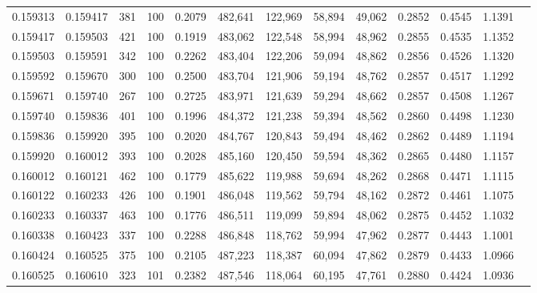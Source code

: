 \begin{tabular}{rrrrrrrrrrrrr}
0.159313 & 0.159417 &   381 & 100 &                                     0.2079 & 482,641 & 122,969 &  58,894 &  49,062 & 0.2852 & 0.4545 & 1.1391 \\
0.159417 & 0.159503 &   421 & 100 &                                     0.1919 & 483,062 & 122,548 &  58,994 &  48,962 & 0.2855 & 0.4535 & 1.1352 \\
0.159503 & 0.159591 &   342 & 100 &                                     0.2262 & 483,404 & 122,206 &  59,094 &  48,862 & 0.2856 & 0.4526 & 1.1320 \\
0.159592 & 0.159670 &   300 & 100 &                                     0.2500 & 483,704 & 121,906 &  59,194 &  48,762 & 0.2857 & 0.4517 & 1.1292 \\
0.159671 & 0.159740 &   267 & 100 &                                     0.2725 & 483,971 & 121,639 &  59,294 &  48,662 & 0.2857 & 0.4508 & 1.1267 \\
0.159740 & 0.159836 &   401 & 100 &                                     0.1996 & 484,372 & 121,238 &  59,394 &  48,562 & 0.2860 & 0.4498 & 1.1230 \\
0.159836 & 0.159920 &   395 & 100 &                                     0.2020 & 484,767 & 120,843 &  59,494 &  48,462 & 0.2862 & 0.4489 & 1.1194 \\
0.159920 & 0.160012 &   393 & 100 &                                     0.2028 & 485,160 & 120,450 &  59,594 &  48,362 & 0.2865 & 0.4480 & 1.1157 \\
0.160012 & 0.160121 &   462 & 100 &                                     0.1779 & 485,622 & 119,988 &  59,694 &  48,262 & 0.2868 & 0.4471 & 1.1115 \\
0.160122 & 0.160233 &   426 & 100 &                                     0.1901 & 486,048 & 119,562 &  59,794 &  48,162 & 0.2872 & 0.4461 & 1.1075 \\
0.160233 & 0.160337 &   463 & 100 &                                     0.1776 & 486,511 & 119,099 &  59,894 &  48,062 & 0.2875 & 0.4452 & 1.1032 \\
0.160338 & 0.160423 &   337 & 100 &                                     0.2288 & 486,848 & 118,762 &  59,994 &  47,962 & 0.2877 & 0.4443 & 1.1001 \\
0.160424 & 0.160525 &   375 & 100 &                                     0.2105 & 487,223 & 118,387 &  60,094 &  47,862 & 0.2879 & 0.4433 & 1.0966 \\
0.160525 & 0.160610 &   323 & 101 &                                     0.2382 & 487,546 & 118,064 &  60,195 &  47,761 & 0.2880 & 0.4424 & 1.0936 \\

\end{tabular}
